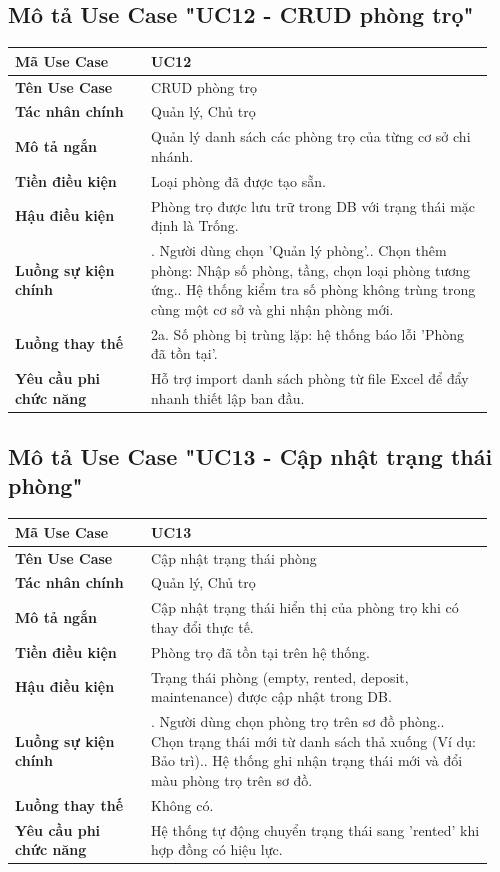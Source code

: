 \subsection{Mô tả Use Case "UC12 - CRUD phòng trọ"}

\begin{longtable}[]{@{}>{\RaggedRight\arraybackslash}p{0.27\linewidth}>{\RaggedRight\arraybackslash}p{0.68\linewidth}@{}}
\toprule
\textbf{Mã Use Case} & UC12\tabularnewline
\midrule
\endhead
\textbf{Tên Use Case} & CRUD phòng trọ\tabularnewline
\textbf{Tác nhân chính} & Quản lý, Chủ trọ\tabularnewline
\textbf{Mô tả ngắn} & Quản lý danh sách các phòng trọ của từng cơ sở chi
nhánh.\tabularnewline
\textbf{Tiền điều kiện} & Loại phòng đã được tạo sẵn.\tabularnewline
\textbf{Hậu điều kiện} & Phòng trọ được lưu trữ trong DB với trạng thái
mặc định là Trống.\tabularnewline
\textbf{Luồng sự kiện chính} & 1. Người dùng chọn
'Quản lý phòng'.\newline 2. Chọn thêm phòng: Nhập số phòng, tầng,
chọn loại phòng tương ứng.\newline 3. Hệ thống kiểm tra số phòng
không trùng trong cùng một cơ sở và ghi nhận phòng mới.\tabularnewline
\textbf{Luồng thay thế} & 2a. Số phòng bị trùng lặp: hệ thống báo lỗi
'Phòng đã tồn tại'.\tabularnewline
\textbf{Yêu cầu phi chức năng} & Hỗ trợ import danh sách phòng từ file
Excel để đẩy nhanh thiết lập ban đầu.\tabularnewline
\bottomrule
\end{longtable}

\subsection{Mô tả Use Case "UC13 - Cập nhật trạng thái phòng"}

\begin{longtable}[]{@{}>{\RaggedRight\arraybackslash}p{0.27\linewidth}>{\RaggedRight\arraybackslash}p{0.68\linewidth}@{}}
\toprule
\textbf{Mã Use Case} & UC13\tabularnewline
\midrule
\endhead
\textbf{Tên Use Case} & Cập nhật trạng thái phòng\tabularnewline
\textbf{Tác nhân chính} & Quản lý, Chủ trọ\tabularnewline
\textbf{Mô tả ngắn} & Cập nhật trạng thái hiển thị của phòng trọ khi có
thay đổi thực tế.\tabularnewline
\textbf{Tiền điều kiện} & Phòng trọ đã tồn tại trên hệ
thống.\tabularnewline
\textbf{Hậu điều kiện} & Trạng thái phòng (empty, rented, deposit,
maintenance) được cập nhật trong DB.\tabularnewline
\textbf{Luồng sự kiện chính} & 1. Người dùng chọn
phòng trọ trên sơ đồ phòng.\newline 2. Chọn trạng thái mới từ danh
sách thả xuống (Ví dụ: Bảo trì).\newline 3. Hệ thống ghi nhận trạng
thái mới và đổi màu phòng trọ trên sơ đồ.\tabularnewline
\textbf{Luồng thay thế} & Không có.\tabularnewline
\textbf{Yêu cầu phi chức năng} & Hệ thống tự động chuyển trạng thái sang
'rented' khi hợp đồng có hiệu lực.\tabularnewline
\bottomrule
\end{longtable}

